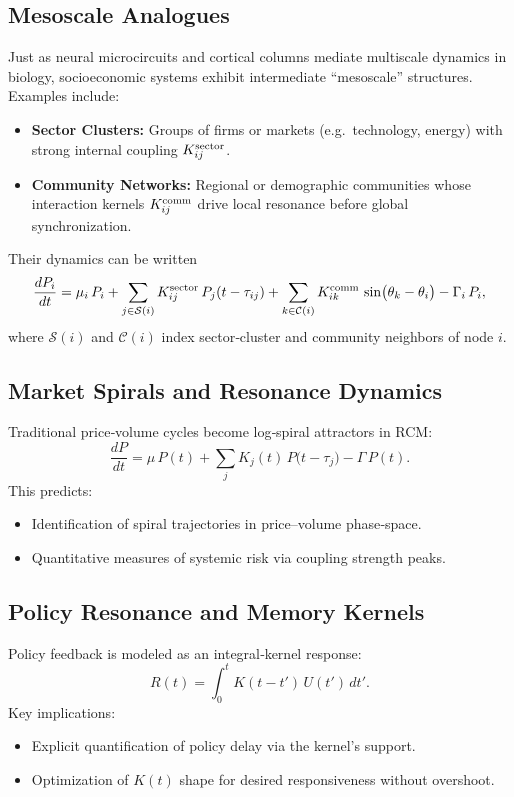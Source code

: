 \subsection{Mesoscale Analogues}
Just as neural microcircuits and cortical columns mediate multiscale dynamics in biology, socioeconomic systems exhibit intermediate “mesoscale” structures. Examples include:
\begin{itemize}
  \item \textbf{Sector Clusters:} Groups of firms or markets (e.g.\ technology, energy) with strong internal coupling $K_{ij}^{\rm sector}$.  
  \item \textbf{Community Networks:} Regional or demographic communities whose interaction kernels $K_{ij}^{\rm comm}$ drive local resonance before global synchronization.
\end{itemize}
Their dynamics can be written
\[
\frac{dP_i}{dt}
= \mu_i\,P_i
+ \sum_{j\in \mathcal{S}(i)} K_{ij}^{\rm sector}\,P_j(t-\tau_{ij})
+ \sum_{k\in \mathcal{C}(i)} K_{ik}^{\rm comm}\,\sin\bigl(\theta_k - \theta_i\bigr)
- \Gamma_i\,P_i,
\]
where $\mathcal{S}(i)$ and $\mathcal{C}(i)$ index sector‐cluster and community neighbors of node $i$.

\subsection{Market Spirals and Resonance Dynamics}
Traditional price‐volume cycles become log‐spiral attractors in RCM:
\[
\frac{dP}{dt}
= \mu\,P(t)
+ \sum_j K_j(t)\,P\bigl(t-\tau_j\bigr)
- \Gamma\,P(t).
\]
This predicts:
\begin{itemize}
  \item Identification of spiral trajectories in price–volume phase‐space.  
  \item Quantitative measures of systemic risk via coupling strength peaks.
\end{itemize}

\subsection{Policy Resonance and Memory Kernels}
Policy feedback is modeled as an integral‐kernel response:
\[
R(t)
= \int_{0}^{t} K(t-t')\,U(t')\,dt'.
\]
Key implications:
\begin{itemize}
  \item Explicit quantification of policy delay via the kernel’s support.  
  \item Optimization of $K(t)$ shape for desired responsiveness without overshoot.
\end{itemize}

